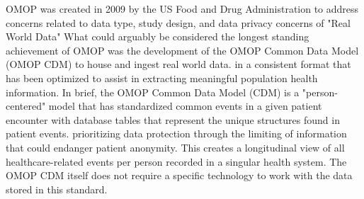 \documentclass{juliacon}
\begin{document}
OMOP was created in 2009 by the US Food and Drug Administration to address concerns related to data type, study design, and data privacy concerns of "Real World Data" \cite{ohdsi2019book} \cite{FDARealWorldEvidence}
What could arguably be considered the longest standing achievement of OMOP was the development of the OMOP Common Data Model (OMOP CDM) to house and ingest real world data.
in a consistent format that has been optimized to assist in extracting meaningful population health information.
In brief, the OMOP Common Data Model (CDM) is a "person-centered" model that has standardized common events in a given patient encounter with database tables that represent the unique structures found in patient events.
prioritizing data protection through the limiting of information that could endanger patient anonymity.
This creates a longitudinal view of all healthcare-related events per person recorded in a singular health system.
The OMOP CDM itself does not require a specific technology to work with the data stored in this standard.
\end{document}
